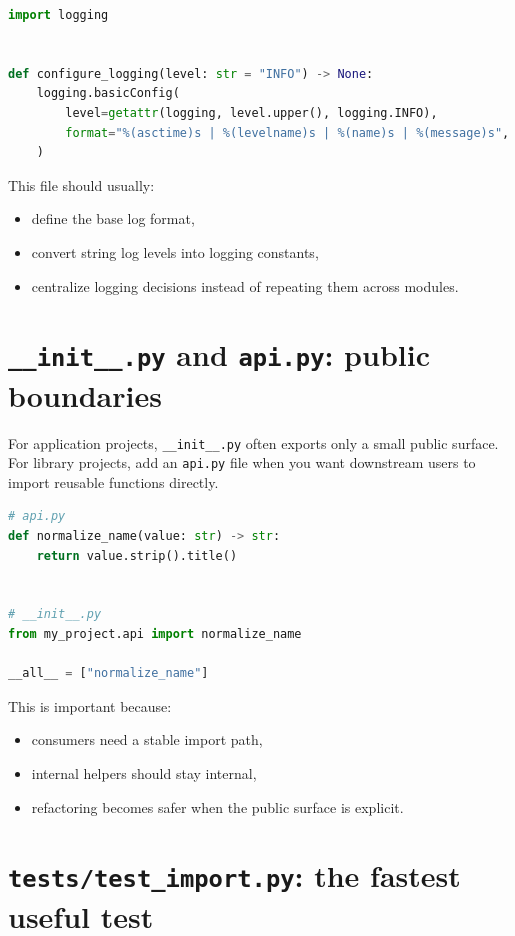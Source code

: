 \documentclass[11pt,oneside]{book}
\begin{document}
\begin{lstlisting}[style=bookcode,language=Python]
import logging


def configure_logging(level: str = "INFO") -> None:
    logging.basicConfig(
        level=getattr(logging, level.upper(), logging.INFO),
        format="%(asctime)s | %(levelname)s | %(name)s | %(message)s",
    )
\end{lstlisting}

This file should usually:
\begin{itemize}
  \item define the base log format,
  \item convert string log levels into logging constants,
  \item centralize logging decisions instead of repeating them across modules.
\end{itemize}

\section*{\texttt{\_\_init\_\_.py} and \texttt{api.py}: public boundaries}

For application projects, \texttt{\_\_init\_\_.py} often exports only a small public surface.  
For library projects, add an \texttt{api.py} file when you want downstream users to import reusable functions directly.

\begin{lstlisting}[style=bookcode,language=Python]
# api.py
def normalize_name(value: str) -> str:
    return value.strip().title()


# __init__.py
from my_project.api import normalize_name

__all__ = ["normalize_name"]
\end{lstlisting}

This is important because:
\begin{itemize}
  \item consumers need a stable import path,
  \item internal helpers should stay internal,
  \item refactoring becomes safer when the public surface is explicit.
\end{itemize}

\section*{\texttt{tests/test\_import.py}: the fastest useful test}
\end{document}
